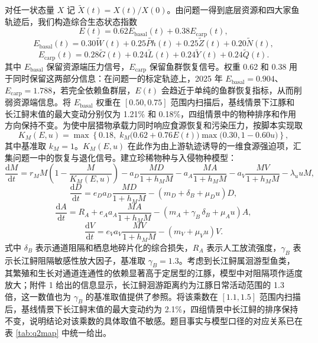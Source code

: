 对任一状态量 $X$ 记 $\widetilde X(t)=X(t)/X(0)$。由问题一得到底层资源和四大家鱼轨迹后，我们构造综合生态状态指数
\begin{equation}
E(t)=0.62E_{\text{basal}}(t)+0.38E_{\text{carp}}(t),
\end{equation}
\begin{equation}
E_{\text{basal}}(t)=0.30\widetilde W(t)+0.25\widetilde{Ph}(t)+0.25\widetilde Z(t)+0.20\widetilde N(t),
\end{equation}
\begin{equation}
E_{\text{carp}}(t)=0.28\widetilde G(t)+0.24\widetilde L(t)+0.24\widetilde Y(t)+0.24\widetilde Q(t).
\end{equation}
其中 $E_{\text{basal}}$ 保留资源端压力信号，$E_{\text{carp}}$ 保留鱼群恢复信号。权重 0.62 和 0.38 用于同时保留这两部分信息：在问题一的标定轨迹上，2025 年 $E_{\text{basal}}=0.904$、$E_{\text{carp}}=1.788$，若完全依赖鱼群层，$E(t)$ 会趋近于单纯的鱼群恢复指标，从而削弱资源端信息。将 $E_{\text{basal}}$ 权重在 $[0.50,0.75]$ 范围内扫描后，基线情景下江豚和长江鲟末值的最大变动分别仅为 1.21\% 和 0.18\%，四组情景中的物种排序和作用方向保持不变。为使中层猎物承载力同时响应食源恢复和污染压力，按脚本实现取
\begin{equation}
K_M(E,u)=\max\left\{0.18,\;k_M\bigl(0.62+0.76E(t)\bigr)\max\bigl(0.30,1-0.60u\bigr)\right\},
\end{equation}
其中基准取 $k_M=1$。$K_M(E,u)$ 在此作为由上游轨迹诱导的一维食源强迫项，汇集问题一中的恢复与退化信号。建立珍稀物种与入侵物种模型\cite{holling1959}：
\begin{equation}
\frac{\mathrm{d}M}{\mathrm{d}t}
=r_M M\left(1-\frac{M}{K_M(E,u)}\right)
-a_D\frac{MD}{1+h_MM}
-a_A\frac{MA}{1+h_MM}
-a_V\frac{MV}{1+h_MM}
-\lambda_u uM,
\end{equation}
\begin{equation}
\frac{\mathrm{d}D}{\mathrm{d}t}
=e_D a_D\frac{MD}{1+h_MM}-(m_D+\delta_B+\mu_Du)D,
\end{equation}
\begin{equation}
\frac{\mathrm{d}A}{\mathrm{d}t}
=R_A+e_A a_A\frac{MA}{1+h_MM}-(m_A+\gamma_B\,\delta_B+\mu_Au)A,
\end{equation}
\begin{equation}
\frac{\mathrm{d}V}{\mathrm{d}t}
=e_V a_V\frac{MV}{1+h_MM}-(m_V+\mu_Vu)V.
\end{equation}
式中 $\delta_B$ 表示通道阻隔和栖息地碎片化的综合损失，$R_A$ 表示人工放流强度，$\gamma_B$ 表示长江鲟阻隔敏感性放大因子，基准取 $\gamma_B=1.3$。考虑到长江鲟属洄游型鱼类，其繁殖和生长对通道连通性的依赖显著高于定居型的江豚，模型中对阻隔项作适度放大；附件 1 给出的信息显示，长江鲟洄游距离约为江豚日常活动范围的 1.3 倍，这一数值也为 $\gamma_B$ 的基准取值提供了参照。将该乘数在 $[1.1,1.5]$ 范围内扫描后，基线情景下长江鲟末值的最大变动约为 2.1\%，四组情景中长江鲟的排序保持不变，说明结论对该乘数的具体取值不敏感。题目事实与模型口径的对应关系已在表 \ref{tab:q2map} 中统一给出。

